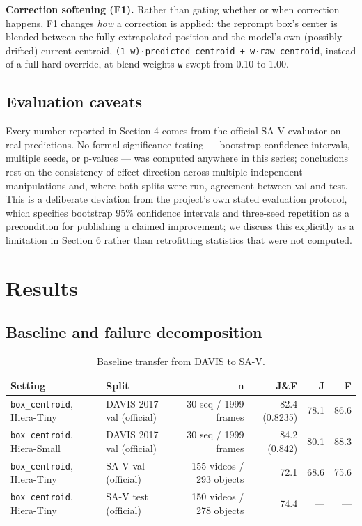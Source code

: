 \documentclass[11pt]{article}
\begin{document}
\textbf{Correction softening (F1).} Rather than gating whether or when correction happens, F1 changes \emph{how} a correction is applied: the reprompt box's center is blended between the fully extrapolated position and the model's own (possibly drifted) current centroid, \texttt{(1-w)·predicted\_centroid + w·raw\_centroid}, instead of a full hard override, at blend weights \texttt{w} swept from 0.10 to 1.00.

\subsection{Evaluation caveats}

Every number reported in Section 4 comes from the official SA-V evaluator on real predictions. No formal significance testing — bootstrap confidence intervals, multiple seeds, or p-values — was computed anywhere in this series; conclusions rest on the consistency of effect direction across multiple independent manipulations and, where both splits were run, agreement between val and test. This is a deliberate deviation from the project's own stated evaluation protocol, which specifies bootstrap 95\% confidence intervals and three-seed repetition as a precondition for publishing a claimed improvement; we discuss this explicitly as a limitation in Section 6 rather than retrofitting statistics that were not computed.

\section{Results}

\subsection{Baseline and failure decomposition}

\begin{table}[!htbp]
\centering
\caption{Baseline transfer from DAVIS to SA-V.}
\label{tab:1}
\small
\begin{tabularx}{\textwidth}{@{}LLRrrr@{}}
\toprule
Setting & Split & n & J\&F & J & F \\
\midrule
\texttt{box\_centroid}, Hiera-Tiny & DAVIS 2017 val (official) & 30 seq / 1999 frames & 82.4 (0.8235) & 78.1 & 86.6 \\
\texttt{box\_centroid}, Hiera-Small & DAVIS 2017 val (official) & 30 seq / 1999 frames & 84.2 (0.842) & 80.1 & 88.3 \\
\texttt{box\_centroid}, Hiera-Tiny & SA-V val (official) & 155 videos / 293 objects & 72.1 & 68.6 & 75.6 \\
\texttt{box\_centroid}, Hiera-Tiny & SA-V test (official) & 150 videos / 278 objects & 74.4 & --- & --- \\
\bottomrule
\end{tabularx}
\end{table}
\end{document}
